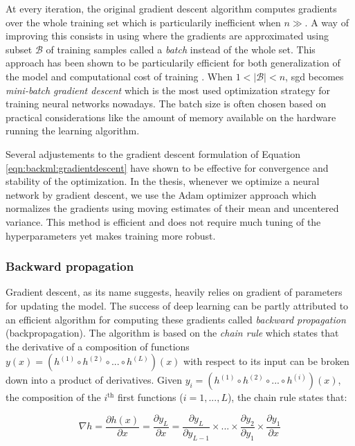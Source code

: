 At every iteration, the original gradient descent algorithm computes gradients
over the whole training set which is particularily inefficient when $n \gg$. A
way of improving this consists in using  where the gradients are
approximated using subset $\mathcal{B}$ of training samples called a \textit{batch}
instead of the whole set. This approach has been shown to be particularily efficient
for both generalization of the model and computational cost of training
\parencite{bottou201113}. When $1 < |\mathcal{B}| < n$, \acrshort{sgd} becomes
\textit{mini-batch gradient descent} which is the most used optimization strategy
for training neural networks nowadays. The batch size is often chosen based on
practical considerations like the amount of memory available on the hardware
running the learning algorithm.

Several adjustements to the gradient descent formulation of Equation
\ref{eqn:backml:gradientdescent} have shown to be effective for convergence and
stability of the optimization. In the thesis, whenever we optimize a neural network
by gradient descent, we use the Adam optimizer \parencite{kingma2014adam} approach
which normalizes the gradients using moving estimates of their mean and uncentered
variance. This method is efficient and does not require much tuning of the
hyperparameters yet makes training more robust.

\subsubsection{Backward propagation}
\label{sssec:backml:backprop}

Gradient descent, as its name suggests, heavily relies on gradient of parameters
for updating the model. The success of deep learning can be partly attributed to
an efficient algorithm for computing these gradients called \textit{backward propagation}
\parencite{rumelhart1986learning} (\aka backpropagation). The algorithm is based
on the \textit{chain rule} which states that the derivative of a composition of
functions $y(x) = (h^{(1)} \circ h^{(2)} \circ ... \circ h^{(L)})(x)$ with respect
to its input can be broken down into a product of derivatives. Given
$y_i = (h^{(1)} \circ h^{(2)} \circ ... \circ h^{(i)})(x)$, the composition of
the $i^{\text{th}}$ first functions ($i = 1, ..., L$), the chain rule states
that:

\begin{equation}
\label{eqn:backml:chainrule}
\nabla h = \dfrac{\partial h(x)}{\partial x} = \dfrac{\partial y_L}{\partial x} = \dfrac{\partial y_L}{\partial y_{L-1}} \times ... \times \dfrac{\partial y_2}{\partial y_1} \times \dfrac{\partial y_1}{\partial x}
\end{equation}

